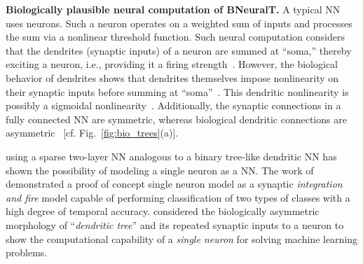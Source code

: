 \documentclass[11pt,a4paper]{article}
\begin{document}
    \textbf{Biologically plausible neural computation of BNeuralT.} A typical NN uses \cite{mcculloch1943logical} neurons. Such a neuron operates on a weighted sum of inputs and processes the sum via a nonlinear threshold function. Such neural computation considers that the dendrites (synaptic inputs) of a neuron are summed at ``soma,'' thereby exciting a neuron, i.e., providing it a firing strength~\citep{mcculloch1943logical,hodgkin1952quantitative,poirazi2003arithmetic}. However, the biological behavior of dendrites shows that dendrites themselves impose nonlinearity on their synaptic inputs before summing at ``soma''~\citep{london2005dendritic,hay2011models}. This dendritic nonlinearity is possibly a sigmoidal nonlinearity~\citep{poirazi2003pyramidal}. Additionally, the synaptic connections in a fully connected NN are symmetric, whereas biological dendritic connections are asymmetric~\citep{mel2016toward,travis2005regional,farhoodi2018sampling} [cf. Fig.~\ref{fig:bio_trees}(a)].

    \cite{poirazi2003pyramidal} using a sparse two-layer NN analogous to a binary tree-like  dendritic NN has shown the possibility of modeling a single neuron as a NN. The work of  \cite{beniaguev2020single} demonstrated a proof of concept single neuron model as a synaptic \textit{integration and fire} model capable of performing classification of two types of classes with a high degree of temporal accuracy. \cite{jones2021might} considered the biologically asymmetric morphology of ``\textit{dendritic tree}'' and its repeated synaptic inputs to a neuron to show the computational capability of a \textit{single neuron} for solving machine learning problems. 
        
\end{document}
